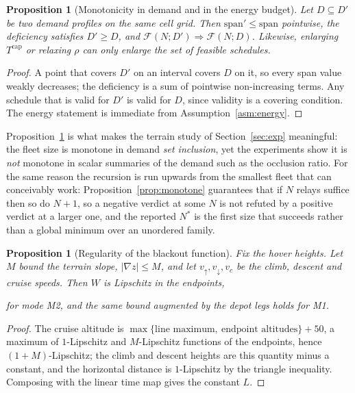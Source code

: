 \documentclass[11pt]{article}
\newcommand{\eqfit}[1]{%
  \par\nobreak
  \begin{center}%
  \resizebox{\ifdim\width>\linewidth\linewidth\else\width\fi}{!}{$\displaystyle #1$}%
  \end{center}%
  \par\nobreak
}
\theoremstyle{dshplain}
\newtheorem{proposition}[theorem]{Proposition}
\theoremstyle{dshdefn}
\begin{document}
\begin{proposition}[Monotonicity in demand and in the energy budget]
\label{prop:demand}
Let $D\subseteq D'$ be two demand profiles on the same cell grid. Then
$\mathrm{span}'\le\mathrm{span}$ pointwise, the deficiency satisfies
$D'\ge D$, and $\mathcal{F}(N;D')\Rightarrow\mathcal{F}(N;D)$. Likewise,
enlarging $T^{\mathrm{cap}}$ or relaxing $\rho$ can only enlarge the set of
feasible schedules.
\end{proposition}
\begin{proof}
A point that covers $D'$ on an interval covers $D$ on it, so every span value
weakly decreases; the deficiency is a sum of pointwise non-increasing terms.
Any schedule that is valid for $D'$ is valid for $D$, since validity is a
covering condition. The energy statement is immediate from
Assumption~\ref{asm:energy}.
\end{proof}

\noindent Proposition~\ref{prop:demand} is what makes the terrain study of
Section~\ref{sec:exp} meaningful: the fleet size is monotone in demand
\emph{set inclusion}, yet the experiments show it is \emph{not} monotone in
scalar summaries of the demand such as the occlusion ratio. For the same reason
the recursion is run upwards from the smallest fleet that can conceivably work:
Proposition~\ref{prop:monotone} guarantees that if $N$ relays suffice then so do
$N+1$, so a negative verdict at some $N$ is not refuted by a positive verdict at a
larger one, and the reported $N^{*}$ is the first size that succeeds rather than a
global minimum over an unordered family.

\begin{proposition}[Regularity of the blackout function]
\label{prop:lipschitz}
Fix the hover heights. Let $M$ bound the terrain slope, $|\nabla z|\le M$, and
let $v_{\uparrow},v_{\downarrow},v_{c}$ be the climb, descent and cruise speeds.
Then $W$ is Lipschitz in the endpoints,
\eqfit{
|W(a,b)-W(a',b')|\ \le\ L\bigl(|a-a'|+|b-b'|\bigr),\qquad
L=\Bigl(\tfrac{1}{v_{\uparrow}}+\tfrac{1}{v_{\downarrow}}\Bigr)(1+M)+\tfrac{1}{v_{c}},
}
for mode M2, and the same bound augmented by the depot legs holds for M1.
\end{proposition}
\begin{proof}
The cruise altitude is $\max\{\text{line maximum},\ \text{endpoint altitudes}\}+50$,
a maximum of $1$-Lipschitz and $M$-Lipschitz functions of the endpoints, hence
$(1+M)$-Lipschitz; the climb and descent heights are this quantity minus a
constant, and the horizontal distance is $1$-Lipschitz by the triangle
inequality. Composing with the linear time map gives the constant $L$.
\end{proof}
\end{document}
